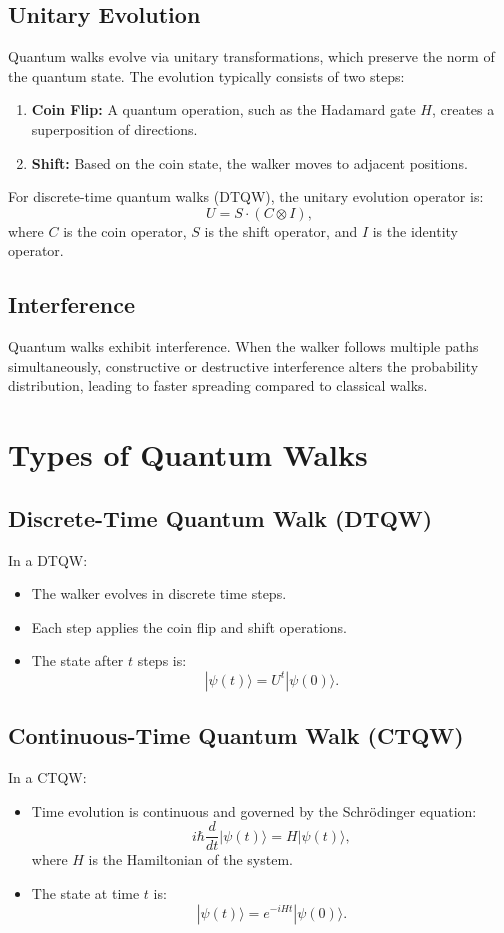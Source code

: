 \documentclass[11pt]{article}
\theoremstyle{definition}
\begin{document}
\subsection*{Unitary Evolution}
Quantum walks evolve via unitary transformations, which preserve the norm of the quantum state. The evolution typically consists of two steps:
\begin{enumerate}
    \item \textbf{Coin Flip:} A quantum operation, such as the Hadamard gate $H$, creates a superposition of directions.
    \item \textbf{Shift:} Based on the coin state, the walker moves to adjacent positions.
\end{enumerate}
For discrete-time quantum walks (DTQW), the unitary evolution operator is:
\[
U = S \cdot (C \otimes I),
\]
where $C$ is the coin operator, $S$ is the shift operator, and $I$ is the identity operator.

\subsection*{Interference}
Quantum walks exhibit interference. When the walker follows multiple paths simultaneously, constructive or destructive interference alters the probability distribution, leading to faster spreading compared to classical walks.

\section*{Types of Quantum Walks}

\subsection*{Discrete-Time Quantum Walk (DTQW)}
In a DTQW:
\begin{itemize}
    \item The walker evolves in discrete time steps.
    \item Each step applies the coin flip and shift operations.
    \item The state after $t$ steps is:
    \[
    |\psi(t)\rangle = U^t |\psi(0)\rangle.
    \]
\end{itemize}

\subsection*{Continuous-Time Quantum Walk (CTQW)}
In a CTQW:
\begin{itemize}
    \item Time evolution is continuous and governed by the Schrödinger equation:
    \[
    i\hbar \frac{d}{dt}|\psi(t)\rangle = H |\psi(t)\rangle,
    \]
    where $H$ is the Hamiltonian of the system.
    \item The state at time $t$ is:
    \[
    |\psi(t)\rangle = e^{-iHt}|\psi(0)\rangle.
    \]
\end{itemize}
\end{document}
